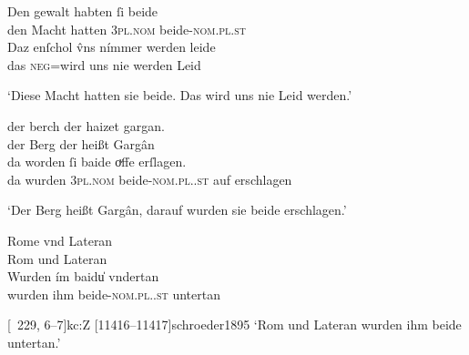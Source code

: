 \begin{exe}
\ex \label{ex:neutralpos}
	\gll Den gewalt habten ſi beide \\
		den Macht hatten \textsc{3pl\subM.nom} beide-\textsc{nom.pl\subM.st} \\
\sn \gll Daz enſchol v̂ns nímmer werden leide \\
		das \textsc{neg}=wird uns nie werden Leid \\
	\begin{taggedline}{\parencites%
		[\pno~13\ra, 41--42]{kc:B1}[vgl.]%
		[\pno~18\rb, 3]{kc:A1}
		[\pno~24\vb, 35]{kc:H}
		[\pno~32\ra, 3]{kc:M}
		[\pno~21\ra, 31]{kc:VB}
		[\pno~37\ra, 26]{kc:P}
		[\pno~23\rb, 5]{kc:C1}
		[\pno~25\rb, 39]{kc:K}
		[\pno~83\ra, 5]{kc:Z}
		[4261--4264]{schroeder1895}
	}
	\trans `Diese Macht hatten sie beide. Das wird uns nie Leid werden.'
	\end{taggedline}

\ex \label{ex:neutralpos2}
	\begin{xlist}
	\ex \label{ex:neutralpos2_1}
		\gll der berch der haizet gargan. \\
			der Berg der heißt Gargân \\
	\sn \gll da worden ſi baide oͮffe erſlagen. \\
			da wurden \textsc{3pl\subM.nom} beide-\textsc{nom.pl.\MascM.st} auf
				erschlagen \\
		\begin{taggedline}{\parencites%
			[\pno~33\rb, 28--30]{kc:A1}[vgl.]%
			[\pno~46\ra, 12]{kc:H}
			[\pno~58\vb, 15]{kc:M}
			[\pno~40\va, 15]{kc:C1}
			[\pno~46\va, 30]{kc:K}
			[\pno~152\va, 5]{kc:Z}
			[7704--7705]{schroeder1895}}
		\trans `Der Berg heißt Gargân, darauf wurden sie beide erschlagen.'
		\end{taggedline}

	\ex \label{ex:neutralpos2_2}
		\gll Rome vnd Lateran \\
			Rom und Lateran \\
	\sn \gll Wurden ím baidu̍ vndertan \\
			wurden ihm beide-\textsc{nom.pl.\NeutI.st} untertan \\
		\begin{taggedline}{\parencites%
			[\pno~68\vb, 13--14]{kc:K}[vgl.]%
			[\pno~49\vb, 15--16]{kc:A1}
			[\pno~69\ra, 29--30]{kc:H}
			[\pno~87\ra, 32--33]{kc:M}
			[\pno~31\vb, 18--19]{kc:B1}
			[\pno~82\va, 45--46]{kc:VB}
			[\pno~60\ra, 14--15]{kc:C1}
			[\pno~229\ra, 6--7]{kc:Z}
			[11416--11417]{schroeder1895}}
		\trans `Rom und Lateran wurden ihm beide untertan.'
		\end{taggedline}
		\\
	\end{xlist}
\end{exe}

